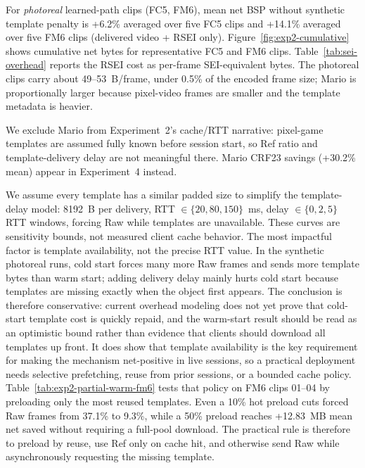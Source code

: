 For \emph{photoreal} learned-path clips (FC5, FM6), mean net BSP without synthetic template penalty is +6.2\% averaged over five FC5 clips and +14.1\% averaged over five FM6 clips (delivered video + RSEI only).
Figure~\ref{fig:exp2-cumulative} shows cumulative net bytes for representative FC5 and FM6 clips.
Table~\ref{tab:sei-overhead} reports the RSEI cost as per-frame SEI-equivalent bytes.
The photoreal clips carry about 49--53~B/frame, under 0.5\% of the encoded frame size; Mario is proportionally larger because pixel-video frames are smaller and the template metadata is heavier.

We exclude Mario from Experiment~2's cache/RTT narrative: pixel-game templates are assumed fully known before session start, so Ref ratio and template-delivery delay are not meaningful there.
Mario CRF23 savings (+30.2\% mean) appear in Experiment~4 instead.

We assume every template has a similar padded size to simplify the template-delay model: 8192~B per delivery, RTT $\in\{20,80,150\}$~ms, delay $\in\{0,2,5\}$ RTT windows, forcing Raw while templates are unavailable.
These curves are sensitivity bounds, not measured client cache behavior.
The most impactful factor is template availability, not the precise RTT value.
In the synthetic photoreal runs, cold start forces many more Raw frames and sends more template bytes than warm start; adding delivery delay mainly hurts cold start because templates are missing exactly when the object first appears.
The conclusion is therefore conservative: current overhead modeling does not yet prove that cold-start template cost is quickly repaid, and the warm-start result should be read as an optimistic bound rather than evidence that clients should download all templates up front.
It does show that template availability is the key requirement for making the mechanism net-positive in live sessions, so a practical deployment needs selective prefetching, reuse from prior sessions, or a bounded cache policy.
Table~\ref{tab:exp2-partial-warm-fm6} tests that policy on FM6 clips 01--04 by preloading only the most reused templates.
Even a 10\% hot preload cuts forced Raw frames from 37.1\% to 9.3\%, while a 50\% preload reaches +12.83~MB mean net saved without requiring a full-pool download.
The practical rule is therefore to preload by reuse, use Ref only on cache hit, and otherwise send Raw while asynchronously requesting the missing template.



